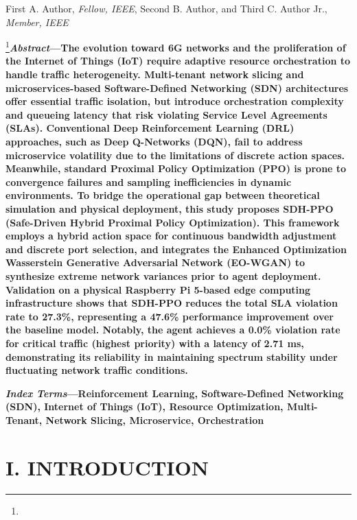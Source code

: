First A. Author, \emph{Fellow, IEEE}, Second B. Author, and Third C. Author Jr., \emph{Member, IEEE}

\footnote{}\textbf{\emph{Abstract}---The evolution toward 6G networks and the proliferation of the Internet of Things (IoT) require adaptive resource orchestration to handle traffic heterogeneity. Multi-tenant network slicing and microservices-based Software-Defined Networking (SDN) architectures offer essential traffic isolation, but introduce orchestration complexity and queueing latency that risk violating Service Level Agreements (SLAs). Conventional Deep Reinforcement Learning (DRL) approaches, such as Deep Q-Networks (DQN), fail to address microservice volatility due to the limitations of discrete action spaces. Meanwhile, standard Proximal Policy Optimization (PPO) is prone to convergence failures and sampling inefficiencies in dynamic environments. To bridge the operational gap between theoretical simulation and physical deployment, this study proposes SDH-PPO (Safe-Driven Hybrid Proximal Policy Optimization). This framework employs a hybrid action space for continuous bandwidth adjustment and discrete port selection, and integrates the Enhanced Optimization Wasserstein Generative Adversarial Network (EO-WGAN) to synthesize extreme network variances prior to agent deployment. Validation on a physical Raspberry Pi 5-based edge computing infrastructure shows that SDH-PPO reduces the total SLA violation rate to 27.3\%, representing a 47.6\% performance improvement over the baseline model. Notably, the agent achieves a 0.0\% violation rate for critical traffic (highest priority) with a latency of 2.71 ms, demonstrating its reliability in maintaining spectrum stability under fluctuating network traffic conditions.}

\textbf{\emph{Index Terms}---Reinforcement Learning, Software-Defined Networking (SDN), Internet of Things (IoT), Resource Optimization, Multi-Tenant, Network Slicing, Microservice, Orchestration}

\section{I. INTRODUCTION}\label{i.-introduction}

